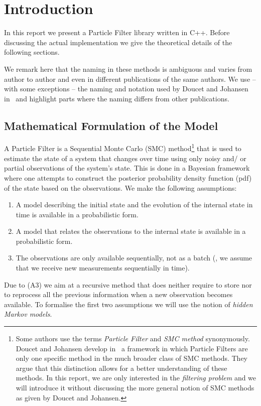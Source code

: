 \section*{Introduction}\label{sec:intro}
In this report we present a Particle Filter library written in
C++. Before discussing the actual implementation we give the
theoretical details of the following sections.

We remark here that the naming in these methods is ambiguous and
varies from author to author and even in different publications of the
same authors. We use -- with some exceptions -- the naming and
notation used by Doucet and Johansen in~\cite{doucet} and highlight
parts where the naming differs from other publications.

\subsection*{Mathematical Formulation of the Model}
A Particle Filter is a Sequential Monte Carlo (SMC)
method\footnote{Some authors use the terms \emph{Particle Filter} and
  \emph{SMC method} synonymously. Doucet and Johansen develop
  in~\cite{doucet} a framework in which Particle Filters are only one
  specific method in the much broader class of SMC methods. They argue
  that this distinction allows for a better understanding of these
  methods. In this report, we are only interested in the
  \emph{filtering problem} and we will introduce it without discussing
  the more general notion of SMC methods as given by Doucet and
  Johansen.} that is used to estimate the state of a system that
changes over time using only noisy and/ or partial observations of the
system's state. This is done in a Bayesian framework where one
attempts to construct the posterior probability density function (pdf)
of the state based on the observations. We make the following
assumptions:
\begin{enumerate}[label=(A\arabic*)]
\item A model describing the initial state and the evolution of the
  internal state in time is available in a probabilistic form.
\item A model that relates the observations to the internal state is
  available in a probabilistic form.
\item The observations are only available sequentially, not as a batch
  (\ie, we assume that we receive new measurements sequentially in
  time).
\end{enumerate}
Due to (A3) we aim at a recursive method that does neither require to
store nor to reprocess all the previous information when a new
observation becomes available. To formalise the first two assumptions
we will use the notion of \emph{hidden Markov models}.


